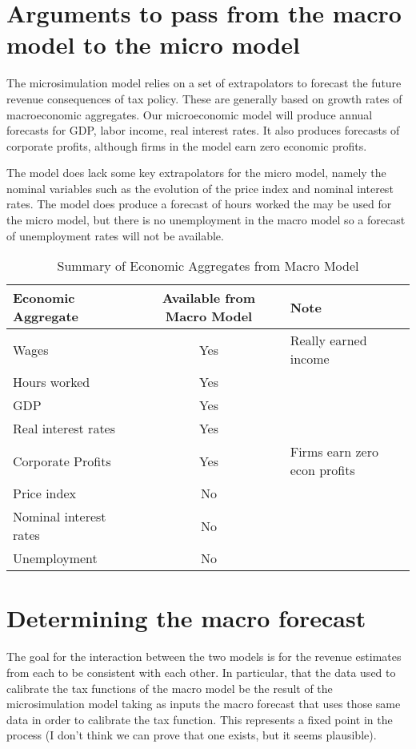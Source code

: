\documentclass[letterpaper,11pt]{article}
\theoremstyle{definition}
\begin{document}
\section{Arguments to pass from the macro model to the micro model}

The microsimulation model relies on a set of extrapolators to forecast the future revenue consequences of tax policy.  These are generally based on growth rates of macroeconomic aggregates.  Our microeconomic model will produce annual forecasts for GDP, labor income, real interest rates.  It also produces forecasts of corporate profits, although firms in the model earn zero economic profits.  

The model does lack some key extrapolators for the micro model, namely the nominal variables such as the evolution of the price index and nominal interest rates.  The model does produce a forecast of hours worked the may be used for the micro model, but there is no unemployment in the macro model so a forecast of unemployment rates will not be available.


\begin{table}[htbp]
  \centering
  \caption{Summary of Economic Aggregates from Macro Model}
    \begin{tabular}{lcl}
    \hline
    \hline
    Economic Aggregate & Available from Macro Model & Note \\
    \hline
    Wages & Yes   & Really earned income \\
    Hours worked & Yes   &  \\
    GDP   & Yes   &  \\
    Real interest rates & Yes   &  \\
    Corporate Profits & Yes   & Firms earn zero econ profits \\
    Price index & No    &  \\
    Nominal interest rates & No    &  \\
    Unemployment & No    &  \\
   \hline
   \hline
    \end{tabular}%
  \label{tab:macro_vars}%
\end{table}%


\section{Determining the macro forecast}

The goal for the interaction between the two models is for the revenue estimates from each to be consistent with each other.  In particular, that the data used to calibrate the tax functions of the macro model be the result of the microsimulation model taking as inputs the macro forecast that uses those same data in order to calibrate the tax function.  This represents a fixed point in the process (I don't think we can prove that one exists, but it seems plausible).  
\end{document}
